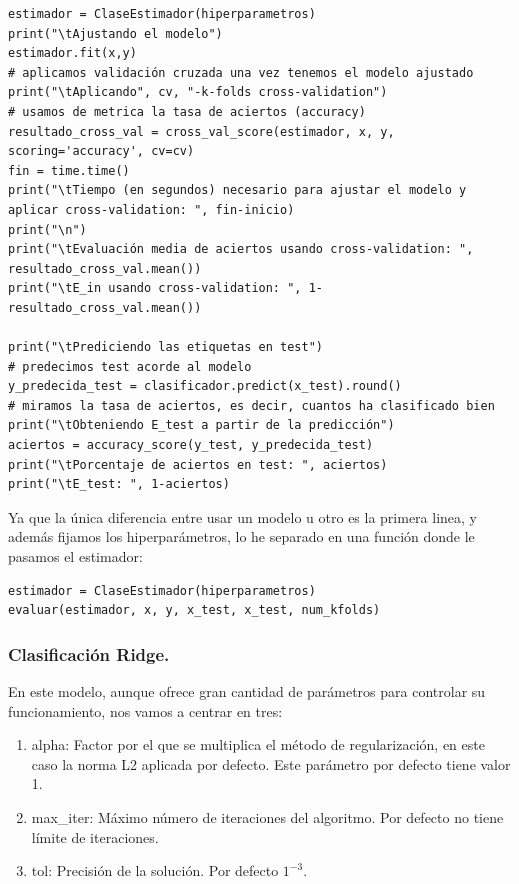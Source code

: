 \documentclass[12pt, spanish]{article}
\begin{document}
\begin{lstlisting}
estimador = ClaseEstimador(hiperparametros)
print("\tAjustando el modelo")
estimador.fit(x,y)
# aplicamos validación cruzada una vez tenemos el modelo ajustado
print("\tAplicando", cv, "-k-folds cross-validation")
# usamos de metrica la tasa de aciertos (accuracy)
resultado_cross_val = cross_val_score(estimador, x, y, scoring='accuracy', cv=cv)
fin = time.time()
print("\tTiempo (en segundos) necesario para ajustar el modelo y aplicar cross-validation: ", fin-inicio)
print("\n")
print("\tEvaluación media de aciertos usando cross-validation: ", resultado_cross_val.mean())
print("\tE_in usando cross-validation: ", 1-resultado_cross_val.mean())

print("\tPrediciendo las etiquetas en test")
# predecimos test acorde al modelo
y_predecida_test = clasificador.predict(x_test).round()
# miramos la tasa de aciertos, es decir, cuantos ha clasificado bien
print("\tObteniendo E_test a partir de la predicción")
aciertos = accuracy_score(y_test, y_predecida_test)
print("\tPorcentaje de aciertos en test: ", aciertos)
print("\tE_test: ", 1-aciertos)
\end{lstlisting}

Ya que la única diferencia entre usar un modelo u otro es la primera linea, y además fijamos los hiperparámetros, lo he separado en una función donde le pasamos el estimador:

\begin{lstlisting}
estimador = ClaseEstimador(hiperparametros)
evaluar(estimador, x, y, x_test, x_test, num_kfolds)
\end{lstlisting}

\subsubsection{Clasificación Ridge.}

En este modelo, aunque ofrece gran cantidad de parámetros para controlar su funcionamiento, nos vamos a centrar en tres:

\begin{enumerate}
	\item alpha: Factor por el que se multiplica el método de regularización, en este caso la norma L2 aplicada por defecto. Este parámetro por defecto tiene valor 1.
	\item max\_iter: Máximo número de iteraciones del algoritmo. Por defecto no tiene límite de iteraciones.
	\item tol: Precisión de la solución. Por defecto $1^{-3}$.
\end{enumerate}
\end{document}

